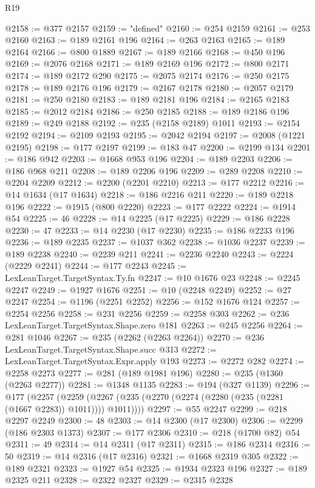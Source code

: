 \begin{lexlean}{R19}
\begin{coremodule}
@2158 := @377 @2157
@2159 := "defined"
@2160 := @254 @2159
@2161 := @253 @2160
@2163 := @189 @2161 @196
@2164 := @263 @2163
@2165 := @189 @2164
@2166 := @800 @1889
@2167 := @189 @2166
@2168 := @450 @196
@2169 := @2076 @2168
@2171 := @189 @2169 @196
@2172 := @800 @2171
@2174 := @189 @2172 @290
@2175 := @2075 @2174
@2176 := @250 @2175
@2178 := @189 @2176 @196
@2179 := @2167 @2178
@2180 := @2057 @2179
@2181 := @250 @2180
@2183 := @189 @2181 @196
@2184 := @2165 @2183
@2185 := @2012 @2184
@2186 := @250 @2185
@2188 := @189 @2186 @196
@2189 := @249 @2188
@2192 := @235 (@2158 @2189) @1011
@2193 := @2154 @2192
@2194 := @2109 @2193
@2195 := @2042 @2194
@2197 := @2008 (@1221 @2195)
@2198 := @177 @2197
@2199 := @183 @47
@2200 := @2199 @134
@2201 := @186 @942
@2203 := @1668 @953 @196
@2204 := @189 @2203
@2206 := @186 @968 @211
@2208 := @189 @2206 @196
@2209 := @289 @2208
@2210 := @2204 @2209
@2212 := @2200 (@2201 @2210)
@2213 := @177 @2212
@2216 := @14 @1634 (@17 @1634)
@2218 := @186 @2216 @211
@2220 := @189 @2218 @196
@2222 := @1915 (@800 @2220)
@2223 := @177 @2222
@2224 := @1914 @54
@2225 := 46
@2228 := @14 @2225 (@17 @2225)
@2229 := @186 @2228
@2230 := 47
@2233 := @14 @2230 (@17 @2230)
@2235 := @186 @2233 @196
@2236 := @189 @2235
@2237 := @1037 @362
@2238 := @1036 @2237
@2239 := @189 @2238
@2240 := @2239 @211
@2241 := @2236 @2240
@2243 := @2224 (@2229 @2241)
@2244 := @177 @2243
@2245 := LexLeanTarget.TargetSyntax.Ty.fn
@2247 := @10 @1676 @23
@2248 := @2245 @2247
@2249 := @1927 @1676
@2251 := @10 (@2248 @2249)
@2252 := @27 @2247
@2254 := @1196 (@2251 @2252)
@2256 := @152 @1676 @124
@2257 := @2254 @2256
@2258 := @231 @2256
@2259 := @2258 @303
@2262 := @236 LexLeanTarget.TargetSyntax.Shape.zero @181
@2263 := @245 @2256
@2264 := @281 @1046
@2267 := @235 (@2262 (@2263 @2264))
@2270 := @236 LexLeanTarget.TargetSyntax.Shape.succ @313
@2272 := LexLeanTarget.TargetSyntax.Expr.apply @193
@2273 := @2272 @282
@2274 := @2258 @2273
@2277 := @281 (@189 @1981 @196)
@2280 := @235 (@1360 (@2263 @2277))
@2281 := @1348 @1135
@2283 := @194 (@327 @1139)
@2296 := @177
    (@2257 (@2259 (@2267 (@235 (@2270 (@2274 (@2280 (@235 (@2281 (@1667 @2283)) @1011)))) @1011))))
@2297 := @55 @2247
@2299 := @218 @2297 @2249
@2300 := 48
@2303 := @14 @2300 (@17 @2300)
@2306 := @2299 (@186 @2303 @1373)
@2307 := @177 @2306
@2310 := @218 (@1700 @82) @54
@2311 := 49
@2314 := @14 @2311 (@17 @2311)
@2315 := @186 @2314
@2316 := 50
@2319 := @14 @2316 (@17 @2316)
@2321 := @1668 @2319 @305
@2322 := @189 @2321
@2323 := @1927 @54
@2325 := @1934 @2323 @196
@2327 := @189 @2325 @211
@2328 := @2322 @2327
@2329 := @2315 @2328

\end{coremodule}
\end{lexlean}
